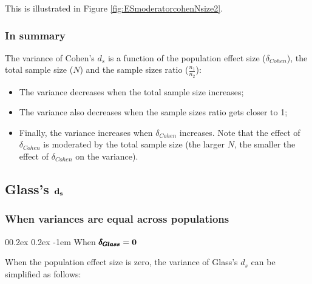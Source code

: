 \documentclass[
  english,
  man]{apa6}
\makeatletter
\providecommand{\tightlist}{%
  \setlength{\itemsep}{0pt}\setlength{\parskip}{0pt}}
\let\oldparagraph\paragraph
\renewcommand{\paragraph}[1]{\oldparagraph{#1}\mbox{}}
\renewcommand{\paragraph}{\@startsection{paragraph}{4}{\parindent}%
  {0\baselineskip \@plus 0.2ex \@minus 0.2ex}%
  {-1em}%
  {\normalfont\normalsize\bfseries\itshape\typesectitle}}
\makeatother
\begin{document}
This is illustrated in Figure \ref{fig:ESmoderatorcohenNsize2}.

\hypertarget{in-summary}{%
\subsubsection{In summary}\label{in-summary}}

The variance of Cohen's \(d_s\) is a function of the population effect size (\(\delta_{Cohen}\)), the total sample size (\(N\)) and the sample sizes ratio (\(\frac{n_1}{n_2}\)):

\begin{itemize}
\tightlist
\item
  The variance decreases when the total sample size increases;\\
\item
  The variance also decreases when the sample sizes ratio gets closer to 1;\\
\item
  Finally, the variance increases when \(\delta_{Cohen}\) increases. Note that the effect of \(\delta_{Cohen}\) is moderated by the total sample size (the larger \(N\), the smaller the effect of \(\delta_{Cohen}\) on the variance).
\end{itemize}

\hypertarget{glasss-bf-d_s}{%
\subsection{\texorpdfstring{Glass's \(\bf d_s\)}{Glass's \textbackslash bf d\_s}}\label{glasss-bf-d_s}}

\hypertarget{when-variances-are-equal-across-populations-1}{%
\subsubsection{When variances are equal across populations}\label{when-variances-are-equal-across-populations-1}}

\hypertarget{when-bf-pmbdelta_glass0}{%
\paragraph{\texorpdfstring{When \(\bf \pmb{\delta_{Glass}}=0\)}{When \textbackslash bf \textbackslash pmb\{\textbackslash delta\_\{Glass\}\}=0}}\label{when-bf-pmbdelta_glass0}}

When the population effect size is zero, the variance of Glass's \(d_s\) can be simplified as follows:
\end{document}
